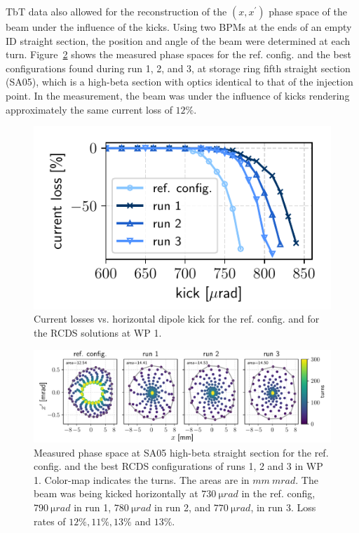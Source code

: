 TbT data also allowed for the reconstruction of the $(x,x^\prime)$ phase space of the beam under the influence of the kicks. Using two BPMs at the ends of an empty ID straight section, the position and angle of the beam were determined at each turn. Figure~\ref{fig:oldtunes_phase} shows the measured phase spaces for the ref. config. and the best configurations found during run 1, 2, and 3, at storage ring fifth straight section (SA05), which is a high-beta section with optics identical to that of the injection point. In the measurement, the beam was under the influence of kicks rendering approximately the same current loss of $12\%$.
\begin{figure}[tb]
    \centering
    \includegraphics[width=0.6\columnwidth]{Images/WEPL087_f1.pdf}
    \caption[Current losses vs. horizontal dipole kick for the ref. config. and for the RCDS solutions at WP 1.]{Current losses vs. horizontal dipole kick for the ref. config. and for the RCDS solutions at WP 1.}
       \label{fig:loss_kicks}
\end{figure}
\begin{figure}[tb]
    \centering
        \includegraphics[width=\textwidth]{Images/WEPL087_f2.pdf}
        \caption[Measured phase space at SA05 high-beta straight section for the ref. config. and the best RCDS configurations of runs 1, 2 and 3 in WP 1.]{Measured phase space at SA05 high-beta straight section for the ref. config. and the best RCDS configurations of runs 1, 2 and 3 in WP 1. Color-map indicates the turns. The areas are in $\unit{mm}~\unit{mrad}$. The beam was being kicked horizontally at $730~\unit{\micro rad}$ in the ref. config, $790~\unit{\micro rad}$ in run 1, $780~\unit{\micro rad}$ in run 2, and $770~\unit{\micro rad}$, in run 3. Loss rates of  $12\%, 11\%, 13\%$ and $13\%$.}
        \label{fig:oldtunes_phase}
\end{figure}

